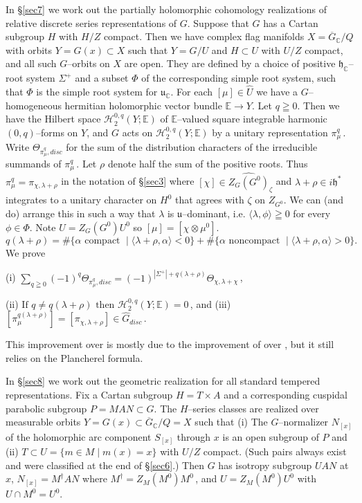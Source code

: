\documentclass{conm-p-l}
\def\gh{\mathfrak{h}}
\def\gu{\mathfrak{u}}
\def\C{\mathbb{C}}
\def\E{\mathbb{E}}
\def\cH{\mathcal{H}}
\begin{document}
In \S \ref{sec7} we work out the partially holomorphic cohomology realizations of
relative discrete series representations of $G$.  Suppose that $G$ has a 
Cartan subgroup $H$ with $H/Z$ compact.  Then we have complex flag manifolds
$X = \overline{G}_\C/Q$ with orbits $Y = G(x) \subset X$ such that
$Y = G/U$ and $H \subset U$ with $U/Z$ compact, and all such $G$--orbits
on $X$ are open.  They are defined by a choice of positive $\gh_\C$--root 
system $\Sigma^+$ and a subset $\Phi$ of the corresponding simple root system,
such that $\Phi$ is the simple root system for $\gu_\C$.  For each 
$[\mu]\in \widehat{U}$ we have a $G$--homogeneous hermitian holomorphic
vector bundle $\E \to Y$.  Let $q \geqq 0$.  Then we have the Hilbert space
$\cH_2^{0,q}(Y;\E)$ of $\E$--valued square integrable harmonic $(0,q)$--forms 
on $Y$, and $G$ acts on $\cH_2^{0,q}(Y;\E)$ by a unitary representation
$\pi_\mu^q$\,.  Write $\Theta_{\pi_\mu^q,disc}$ for the sum of the distribution
characters of the irreducible summands of $\pi_\mu^q$\,.  Let $\rho$ denote
half the sum of the positive roots.  Thus $\pi_\mu^q = \pi_{\chi,\lambda+\rho}$
in the notation of \S \ref{sec3} where $[\chi] \in \widehat{Z_G(G^0)}_\zeta$ and
$\lambda + \rho \in i\gh^*$ integrates to a unitary character on $H^0$
that agrees with $\zeta$ on $Z_{G^0}$.  We can (and do) arrange this in such 
a way that $\lambda$ is $\gu$--dominant, i.e. $\langle \lambda, \phi \rangle
\geqq 0$ for every $\phi \in \Phi$.  Note 
$U = Z_G(G^0)U^0$ so $[\mu] = [\chi \otimes \mu^0]$.
$$
q(\lambda + \rho) = \#\{\alpha \text{ compact } \mid
	\langle \lambda + \rho,\alpha \rangle < 0\} +
	\#\{\alpha \text{ noncompact } \mid
        \langle \lambda + \rho,\alpha \rangle > 0\}.
$$
We prove

(i) $\sum_{q \geqq 0} (-1)^q \Theta_{\pi_\mu^q,disc} = 
	(-1)^{|\Sigma^+| + q(\lambda+\rho)} \Theta_{\chi,\lambda+\chi}$\,,

(ii) $\text{If } q \ne q(\lambda + \rho) \text{ then } 
	\cH_2^{0,q}(Y;\E) = 0$\,, and 
(iii) $[\pi_\mu^{q(\lambda +\rho)}]=[\pi_{\chi,\lambda+\rho}]\in\widehat{G}_{disc}$\,.

\noindent
This improvement over \cite[\S 7]{W1973} is mostly due to the improvement
of \cite{S1976} over \cite{S1971}, but it still relies on the Plancherel 
formula.

In \S \ref{sec8} we work out the geometric realization for all standard tempered
representations.  Fix a Cartan subgroup $H = T \times A$ and a corresponding
cuspidal parabolic subgroup $P = MAN \subset G$.  The $H$--series classes
are realized over measurable orbits $Y = G(x) \subset \overline{G}_\C/Q = X$
such that (i) The $G$--normalizer $N_{[x]}$ of the holomorphic arc
component $S_{[x]}$ through $x$ is an open subgroup of $P$ and (ii) 
$T \subset U = \{m \in M \mid m(x) = x\}$ with $U/Z$ compact.  (Such pairs 
always exist and were classified at the end of \S \ref{sec6}.)  Then
$G$ has isotropy subgroup $UAN$ at $x$, $N_{[x]} = M^\dagger AN$ where
$M^\dagger = Z_M(M^0)M^0$\,, and $U = Z_M(M^0)U^0$ with $U \cap M^0 = U^0$.
\end{document}
